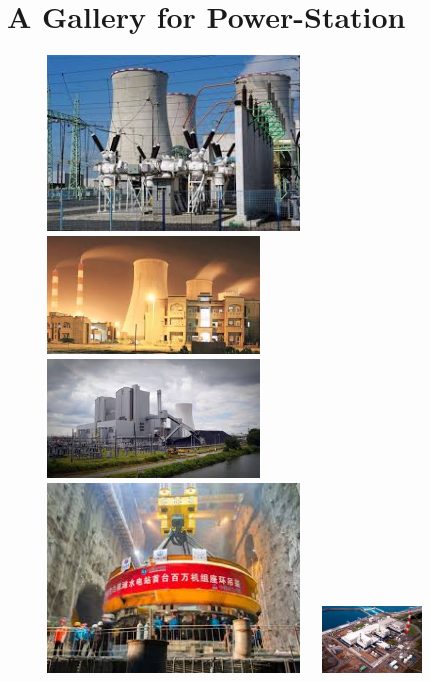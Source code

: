 \documentclass[11 pt]{article}
\begin{document}
\section{A Gallery for Power-Station}
\begin{figure}[h]
	\includegraphics[width=190pt]{Gallery/One.jpg}\hspace{2 mm}
	\includegraphics[width=160pt]{Gallery/Two.jpg}\vspace{2 mm}
	\includegraphics[width=160pt]{Gallery/Three.jpg}\hspace{1 mm}
	\includegraphics[width=190pt]{Gallery/Four.jpg}\vspace{3 mm}
	\includegraphics[width=100pt, height=50pt]{Gallery/Five.jpg}

\end{figure}
\end{document}
